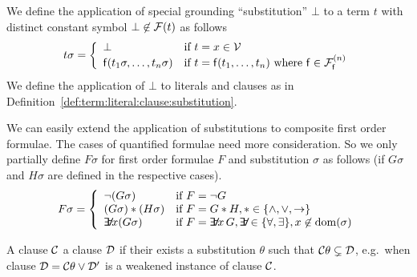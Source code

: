 \begin{definition}\label{def:term:literal:clause:substitution}
	We define the application of special grounding “substitution” \( \bot \) to a term \( t \) with distinct constant symbol \( \bot \not\in\mcF(t) \)
	as follows
	\begin{gather*}
	\MDEFINE{t\sigma}{ll}{
			\bot & \text{if }t=x\in\mcV
			\\
			\mf(t_1\sigma,\ldots,t_n\sigma)	&\text{if }t=\mf(t_1,\ldots,t_n)
			\text{ where  }
			 \mf\in\mcFfn
			 }
	\end{gather*}
	We define the application of \( \bot \) to literals and clauses as in
	Definition~\vref{def:term:literal:clause:substitution}.

\end{definition}

\begin{definition}
	We can easily extend the application of substitutions
	to composite first order formulae.
	The cases of quantified formulae need more consideration.
	So we only partially define \( F\sigma \) for first order formulae \( F \) and substitution \( \sigma \) as follows (if \( G\sigma \) and \( H\sigma \) are defined in the respective cases).
	\begin{gather*}
	\MDEFINE{F\sigma}{ll}{
		\lnot(G\sigma) & \text{if }F = \lnot G
		\\
		(G\sigma) * (H\sigma) & \text{if }F = G * H, *\in \{ \land, \lor, \limp \}
		\\
		\quantify x (G\sigma) &\text{if }F = \quantify x\,G,
		\quantify \in \{ \forall, \exists \},
		x\not\in\domain(\sigma)
	}
	\end{gather*}
\end{definition}

\begin{definition}\label{def:strictly:subsumes}
	A clause \( \mcC \)  a clause \( \mcD \) if their exists a substitution \( \theta \) such that \( \mcC\theta \subsetneq \mcD \),
	e.g.~when clause \( \mcD = \mcC\theta \lor \mcD' \) is a weakened instance of clause \( \mcC \).
\end{definition}

